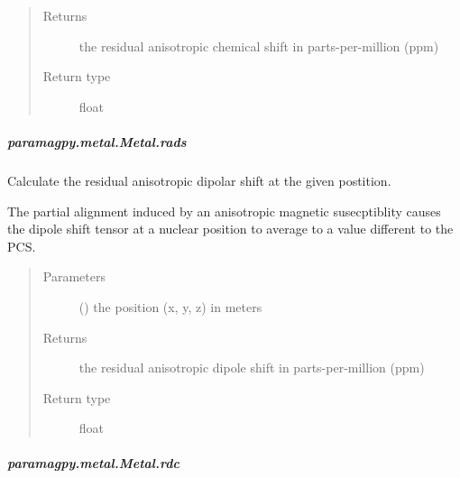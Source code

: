 \documentclass[a4paper,10pt,english]{sphinxmanual}
\begin{document}
\begin{fulllineitems}
\begin{fulllineitems}
\begin{fulllineitems}
\begin{quote}
\begin{description}
\item[{Returns}] \leavevmode
{} \textendash{} the residual anisotropic chemical shift in parts-per-million (ppm)

\item[{Return type}] \leavevmode
float

\end{description}\end{quote}

\end{fulllineitems}



\subparagraph{paramagpy.metal.Metal.rads}
\label{\detokenize{reference/generated/paramagpy.metal.Metal.rads:paramagpy-metal-metal-rads}}\label{\detokenize{reference/generated/paramagpy.metal.Metal.rads::doc}}

\begin{fulllineitems}
\label{\detokenize{reference/generated/paramagpy.metal.Metal.rads:paramagpy.metal.Metal.rads}}
Calculate the residual anisotropic dipolar shift at the
given postition.

The partial alignment induced by an anisotropic
magnetic susecptiblity causes the dipole shift tensor at a nuclear
position to average to a value different to the PCS.
\begin{quote}\begin{description}
\item[{Parameters}] \leavevmode
{} () \textendash{} the position (x, y, z) in meters

\item[{Returns}] \leavevmode
{} \textendash{} the residual anisotropic dipole shift in parts-per-million (ppm)

\item[{Return type}] \leavevmode
float

\end{description}\end{quote}

\end{fulllineitems}



\subparagraph{paramagpy.metal.Metal.rdc}
\label{\detokenize{reference/generated/paramagpy.metal.Metal.rdc:paramagpy-metal-metal-rdc}}\label{\detokenize{reference/generated/paramagpy.metal.Metal.rdc::doc}}


\end{fulllineitems}
\end{fulllineitems}
\end{document}
